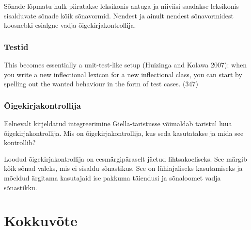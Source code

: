 \documentclass[12pt,a4paper]{article}
\begin{document}
Sõnade lõpmatu hulk piiratakse leksikonis antuga ja niiviisi saadakse leksikonis sisalduvate sõnade kõik sõnavormid. Nendest ja ainult nendest sõnavormidest koosnebki esialgne vadja õigekirja\-kontrollija.


\subsubsection{Testid}
\label{sec:giella-testid}
This becomes essentially a unit-test-like setup (Huizinga and Kolawa 2007): when you write a new inflectional lexicon for a new inflectional class, you can start by spelling out the wanted behaviour in the form of test cases. (347)


\subsubsection{Õigekirjakontrollija}
\label{sec:giella-õigekirjakontrollija}

Eelnevalt kirjeldatud integreerimine Giella-taristusse võimaldab taristul luua õigekirjakontrollija. Mis on õigekirjakontrollija, kus seda kasutatakse ja mida see kontrollib?


Loodud õigekirjakontrollija on eesmärgipäraselt jäetud lihtsakoeliseks. See märgib kõik sõnad valeks, mis ei sisaldu sõnastikus. See on lühiajaliseks kasutamiseks ja mõeldud ärgitama kasutajaid ise pakkuma täiendusi ja sõnaloomet vadja sõnastikku.






\newpage
\section{Kokkuvõte}
\label{sec:kokkuvõte}
\end{document}
